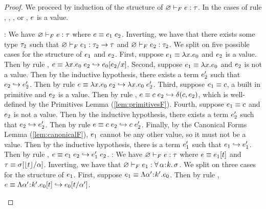 \begin{proof} 
  We proceed by induction of the structure of 
  ${\varnothing} \vdash_F {e} : {\tau}$. In the cases of rule
  \fPrim, \fVar, \fAbs, or \fTAbs, $e$ is a value.
  \begin{itemize}
  \pfcase{\fApp}: We have 
  ${\varnothing} \vdash_F {e} : {\tau}$ where
  $\sexpr \equiv \app{\sexpr_1}{\sexpr_2}$. 
  Inverting, we have that there exists some type $\tau_2$
  such that ${\varnothing} \vdash_F {e_1} : {\tau_2 \rightarrow \tau}$
  and ${\varnothing} \vdash_F {e_2} : {\tau_2}$.
  We split on five possible cases for 
  the structure of $e_1$ and $e_2$. 
  First, suppose $e_1 \equiv \lambda x. {e_0}$ and $e_2$ is 
  a value. Then by rule \eAppAbs, 
  $e \equiv \app{\vabs{x}{\sexpr_0}}{\sexpr_2} \step \subst{\sexpr_0}{x}{\sexpr_2}$.
  Second, suppose $e_1 \equiv \lambda x. {e_0}$ and $e_2$
  is not a value. Then by the inductive hypothesis, there exists a term
  $e'_2$ such that $e_2 \hookrightarrow e'_2$. Then by rule \eAppV
  $e \equiv {\ensuremath{\lambda x. {e_0}}}\;{e_2} \hookrightarrow {\ensuremath{\lambda x. {e_0}}}\;{e'_2}$.
  Third, suppose $e_1 \equiv c$, a built in primitive 
  and $e_2$ is a value. Then by rule \ePrim, 
  $e \equiv {\ensuremath{c}}\;{e_2} \hookrightarrow \delta(c,e_2)$,
  which is well-defined by the Primitives Lemma (\ref{lem:primitivesF}).
  Fourth, suppose $e_1 \equiv c$ and $e_2$
  is not a value. Then by the inductive hypothesis, there exists a term
  $e'_2$ such that $e_2 \hookrightarrow e'_2$. Then by rule \eAppV
  $e \equiv {\ensuremath{c}}\;{e_2} \hookrightarrow {\ensuremath{c}}\;{e'_2}$.
  Finally, by the Canonical Forms Lemma (\ref{lem:canonicalF}),
  $e_1$ cannot be any other
  value, so it must not be a value. Then by the inductive hypothesis,
  there is a term $e'_1$ such that $e_1 \hookrightarrow e'_1$. 
  Then by rule \eApp,
  $e \equiv \app{\sexpr_1}{\sexpr_2} \step \app{\sexpr'_1}{\sexpr_2}$.
  \pfcase{\fTApp}: We have 
  ${\varnothing} \vdash_F {e} : {\tau}$ where
  $e \equiv e_1[t]$ and
  $\tau \equiv {\sigma}[\lfloor{\ensuremath{t}}\rfloor/\alpha]$. 
  Inverting, we have that 
  ${\varnothing} \vdash_F {e_1} : {\forall\, \alpha\hspace{0.05em}{:}\hspace{0.05em} k.\, \sigma}$.
  We split on three cases for the structure of $e_1$.
  First, suppose $\sexpr_1 \equiv \tabs{\tvar'}{\skind'}{\sexpr_0}$.
  Then by rule \eTAppAbs, 
  $\sexpr \equiv \tyapp{\tabs{\tvar'}{\skind'}{\sexpr_0}}{\stype} 
  \step \subst{\sexpr_0}{\tvar'}{\stype}$.

\end{itemize}
\end{proof}
